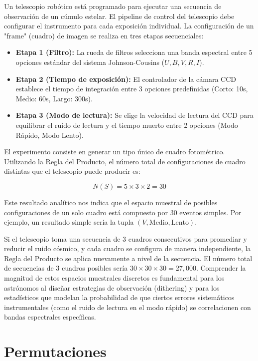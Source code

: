 Un telescopio robótico está programado para ejecutar una secuencia de observación de un cúmulo estelar. El pipeline de control del telescopio debe configurar el instrumento para cada exposición individual. La configuración de un "frame" (cuadro) de imagen se realiza en tres etapas secuenciales:
\begin{itemize}
    \item \textbf{Etapa 1 (Filtro):} La rueda de filtros selecciona una banda espectral entre 5 opciones estándar del sistema Johnson-Cousins ($U, B, V, R, I$).
    \item \textbf{Etapa 2 (Tiempo de exposición):} El controlador de la cámara CCD establece el tiempo de integración entre 3 opciones predefinidas (Corto: 10s, Medio: 60s, Largo: 300s).
    \item \textbf{Etapa 3 (Modo de lectura):} Se elige la velocidad de lectura del CCD para equilibrar el ruido de lectura y el tiempo muerto entre 2 opciones (Modo Rápido, Modo Lento).
\end{itemize}

El experimento consiste en generar un tipo único de cuadro fotométrico. Utilizando la Regla del Producto, el número total de configuraciones de cuadro distintas que el telescopio puede producir es:

$$ N(S) = 5 \times 3 \times 2 = 30 $$

Este resultado analítico nos indica que el espacio muestral de posibles configuraciones de un solo cuadro está compuesto por 30 eventos simples. Por ejemplo, un resultado simple sería la tupla $(V, \text{Medio}, \text{Lento})$. 

Si el telescopio toma una secuencia de 3 cuadros consecutivos para promediar y reducir el ruido cósmico, y cada cuadro se configura de manera independiente, la Regla del Producto se aplica nuevamente a nivel de la secuencia. El número total de secuencias de 3 cuadros posibles sería $30 \times 30 \times 30 = 27,000$. Comprender la magnitud de estos espacios muestrales discretos es fundamental para los astrónomos al diseñar estrategias de observación (dithering) y para los estadísticos que modelan la probabilidad de que ciertos errores sistemáticos instrumentales (como el ruido de lectura en el modo rápido) se correlacionen con bandas espectrales específicas.

\section{Permutaciones}

